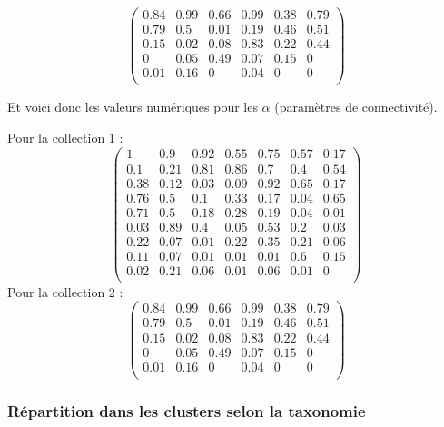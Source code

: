 \normalsize\newline\[\begin{pmatrix} 0.84 &0.99 &0.66 &0.99 &0.38 &0.79 \\0.79 &0.5 &0.01 &0.19 &0.46 &0.51 \\0.15 &0.02 &0.08 &0.83 &0.22 &0.44 \\0 &0.05 &0.49 &0.07 &0.15 &0 \\0.01 &0.16 &0 &0.04 &0 &0 \\ \end{pmatrix}\]

Et voici donc les valeurs numériques pour les \(\alpha\) (paramètres de
connectivité).

Pour la collection 1 :
\[\begin{pmatrix} 1 &0.9 &0.92 &0.55 &0.75 &0.57 &0.17 \\0.1 &0.21 &0.81 &0.86 &0.7 &0.4 &0.54 \\0.38 &0.12 &0.03 &0.09 &0.92 &0.65 &0.17 \\0.76 &0.5 &0.1 &0.33 &0.17 &0.04 &0.65 \\0.71 &0.5 &0.18 &0.28 &0.19 &0.04 &0.01 \\0.03 &0.89 &0.4 &0.05 &0.53 &0.2 &0.03 \\0.22 &0.07 &0.01 &0.22 &0.35 &0.21 &0.06 \\0.11 &0.07 &0.01 &0.01 &0.01 &0.6 &0.15 \\0.02 &0.21 &0.06 &0.01 &0.06 &0.01 &0 \\ \end{pmatrix}\]
Pour la collection 2 :
\[\begin{pmatrix} 0.84 &0.99 &0.66 &0.99 &0.38 &0.79 \\0.79 &0.5 &0.01 &0.19 &0.46 &0.51 \\0.15 &0.02 &0.08 &0.83 &0.22 &0.44 \\0 &0.05 &0.49 &0.07 &0.15 &0 \\0.01 &0.16 &0 &0.04 &0 &0 \\ \end{pmatrix}\]

\hypertarget{ruxe9partition-dans-les-clusters-selon-la-taxonomie-1}{%
\subsubsection{Répartition dans les clusters selon la
taxonomie}\label{ruxe9partition-dans-les-clusters-selon-la-taxonomie-1}}

